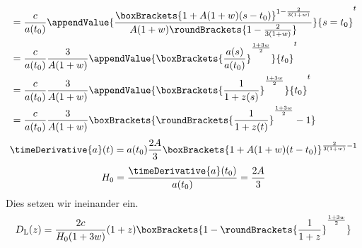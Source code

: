 \documentclass{atistandalonetask}
\begin{document}
\begin{atiSolution}
\begin{atiSubtaskSolutions}
{\begin{align*}
          &= \frac{c}{a(t_0)}
            \appendValue{
              \frac{\boxBrackets{1+A(1+w)(s-t_0)}^{1-\frac{2}{3(1+w)}}}{A(1+w)\roundBrackets{1-\frac{2}{3(1+w)}}}
            }{s=t_0}^t \\
          &= \frac{c}{a(t_0)} \frac{3}{A(1+w)}
          \appendValue{
            \boxBrackets{\frac{a(s)}{a(t_0)}}^{\frac{1+3w}{2}}
          }{t_0}^t \\
          &= \frac{c}{a(t_0)} \frac{3}{A(1+w)}
          \appendValue{
            \boxBrackets{\frac{1}{1+z(s)}}^{\frac{1+3w}{2}}
          }{t_0}^t \\
          &= \frac{c}{a(t_0)} \frac{3}{A(1+w)}
              \boxBrackets{\roundBrackets{\frac{1}{1+z(t)}}^{\frac{1+3w}{2}} -1} \\
        \end{align*}
        \[
          \timeDerivative{a}(t) = a(t_0)\frac{2A}{3}
          \boxBrackets{
            1 + A(1+w)(t-t_0)
          }^{\frac{2}{3(1+w)}-1}
        \]
        \[
          H_0 = \frac{\timeDerivative{a}(t_0)}{a(t_0)} = \frac{2A}{3}
        \]
        Dies setzen wir ineinander ein.
        \[
          D_\mathrm{L}(z) = \frac{2c}{H_0(1+3w)}(1+z)\boxBrackets{1 - \roundBrackets{ \frac{1}{1+z} }^{\frac{1+3w}{2}}}
        \]
      }
    \end{atiSubtaskSolutions}
  \end{atiSolution}
\end{document}
